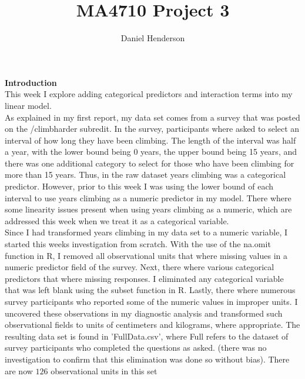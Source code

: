 \documentclass[11pt]{amsart}
\title{MA4710 Project 3}
\author{Daniel Henderson}
\begin{document}
\maketitle

{\bf Introduction}\\

This week I explore adding categorical predictors and interaction terms into my linear model.\\

As explained in my first report, my data set comes from a survey that was posted on the /climbharder subredit.
In the survey, participants where asked to select an interval of how long they have been climbing.
The length of the interval was half a year, with the lower bound being 0 years, the upper bound being 15 years, and there was one additional category to select for those who have been climbing for more than 15 years.
Thus, in the raw dataset years climbing was a categorical predictor.
However, prior to this week I was using the lower bound of each interval to use years climbing as a numeric predictor in my model.
There where some linearity issues present when using years climbing as a numeric, which are addressed this week when we treat it as a categorical variable.\\

Since I had transformed years climbing in my data set to a numeric variable, I started this weeks investigation from scratch.
With the use of the na.omit function in R, I removed all observational units that where missing values in a numeric predictor field of the survey.
Next, there where various categorical predictors that where missing responses.
I eliminated any categorical variable that was left blank using the subset function in R.
Lastly, there where numerous survey participants who reported some of the numeric values in improper units.
I uncovered these observations in my diagnostic analysis and transformed such observational fields to units of centimeters and kilograms, where appropriate.
The resulting data set is found in 'FullData.csv', where Full refers to the dataset of survey participants who completed the questions as asked.
(there was no investigation to confirm that this elimination was done so without bias).
There are now $126$ observational units in this set\\
\end{document}
